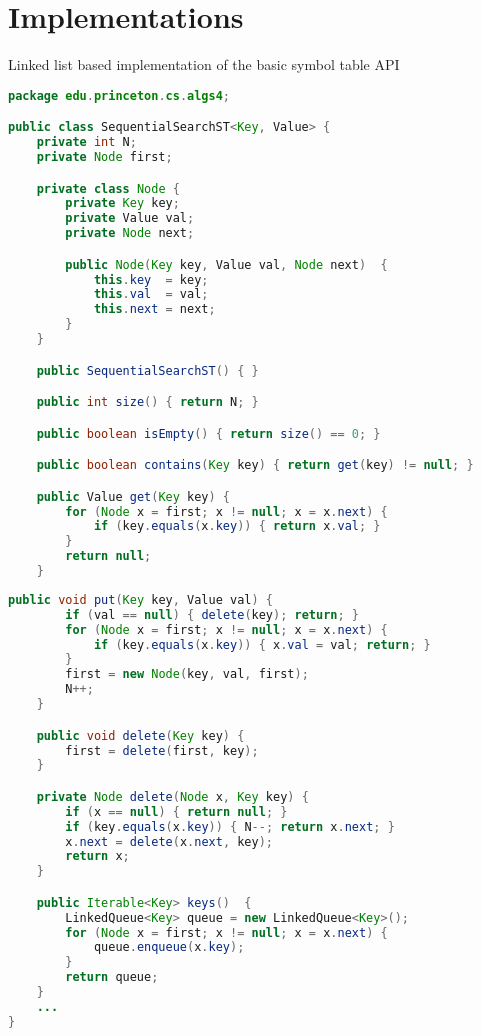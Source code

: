 \documentclass[8pt,a4paper,compress]{beamer}
\begin{document}
\section{Implementations}
\begin{frame}[fragile]
Linked list based implementation of the basic symbol table API

\begin{lstlisting}[language=Java]
package edu.princeton.cs.algs4;

public class SequentialSearchST<Key, Value> {
    private int N; 
    private Node first; 

    private class Node {
        private Key key;
        private Value val;
        private Node next;

        public Node(Key key, Value val, Node next)  {
            this.key  = key;
            this.val  = val;
            this.next = next;
        }
    }

    public SequentialSearchST() { }

    public int size() { return N; }

    public boolean isEmpty() { return size() == 0; }

    public boolean contains(Key key) { return get(key) != null; }

    public Value get(Key key) {
        for (Node x = first; x != null; x = x.next) {
            if (key.equals(x.key)) { return x.val; }
        }
        return null;
    }
\end{lstlisting}
\end{frame}

\begin{frame}[fragile]
\begin{lstlisting}[language=Java]
    public void put(Key key, Value val) {
        if (val == null) { delete(key); return; }
        for (Node x = first; x != null; x = x.next) {
            if (key.equals(x.key)) { x.val = val; return; }
        }
        first = new Node(key, val, first);
        N++;
    }

    public void delete(Key key) {
        first = delete(first, key);
    }

    private Node delete(Node x, Key key) {
        if (x == null) { return null; }
        if (key.equals(x.key)) { N--; return x.next; }
        x.next = delete(x.next, key);
        return x;
    }

    public Iterable<Key> keys()  {
        LinkedQueue<Key> queue = new LinkedQueue<Key>();
        for (Node x = first; x != null; x = x.next) {
            queue.enqueue(x.key);
        }
        return queue;
    }
    ...
}
\end{lstlisting}
\end{frame}
\end{document}
